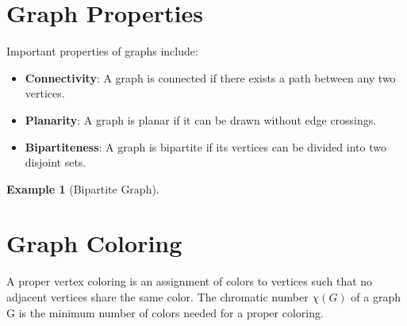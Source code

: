 \documentclass[12pt,a4paper]{article}
\theoremstyle{definition}
\newtheorem{example}[definition]{Example}
\begin{document}
\section{Graph Properties}

\begin{tcolorbox}[theorembox]
Important properties of graphs include:
\begin{itemize}
    \item \textbf{Connectivity}: A graph is connected if there exists a path between any two vertices.
    \item \textbf{Planarity}: A graph is planar if it can be drawn without edge crossings.
    \item \textbf{Bipartiteness}: A graph is bipartite if its vertices can be divided into two disjoint sets.
\end{itemize}
\end{tcolorbox}

\begin{example}[Bipartite Graph]
\begin{center}
\end{center}
\end{example}

\section{Graph Coloring}
\begin{tcolorbox}[theorembox]
A proper vertex coloring is an assignment of colors to vertices such that no adjacent vertices share the same color. The chromatic number \(\chi(G)\) of a graph G is the minimum number of colors needed for a proper coloring.
\end{tcolorbox}
\end{document}
